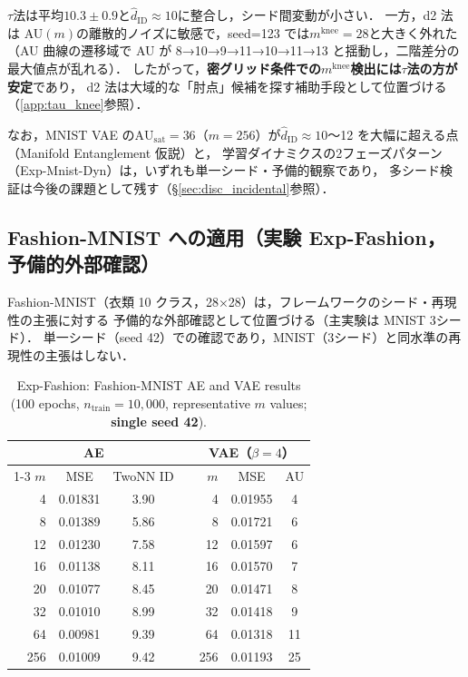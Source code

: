 \documentclass[11pt,a4paper]{jsarticle}
\newcommand{\AUsat}{\mathrm{AU}_{\mathrm{sat}}}
\newcommand{\mknee}{m^{\mathrm{knee}}}
\begin{document}
$\tau$法は平均$10.3 \pm 0.9$と$\hat{d}_\mathrm{ID} \approx 10$に整合し，シード間変動が小さい．
一方，d2 法は AU$(m)$の離散的ノイズに敏感で，seed=123 では$\mknee = 28$と大きく外れた
（AU 曲線の遷移域で AU が 8→10→9→11→10→11→13 と揺動し，二階差分の最大値点が乱れる）．
したがって，\textbf{密グリッド条件での$\mknee$検出には$\tau$法の方が安定}であり，
d2 法は大域的な「肘点」候補を探す補助手段として位置づける（\ref{app:tau_knee}参照）．

なお，MNIST VAE の$\AUsat = 36$（$m=256$）が$\hat{d}_\mathrm{ID} \approx 10$〜12 を大幅に超える点（Manifold Entanglement 仮説）と，
学習ダイナミクスの2フェーズパターン（Exp-Mnist-Dyn）は，いずれも単一シード・予備的観察であり，
多シード検証は今後の課題として残す（§\ref{sec:disc_incidental}参照）．

\subsection{Fashion-MNIST への適用（実験 Exp-Fashion，予備的外部確認）}\label{sec:exp_fashion}

Fashion-MNIST（衣類 10 クラス，28×28）は，フレームワークのシード・再現性の主張に対する
予備的な外部確認として位置づける（主実験は MNIST 3シード）．
単一シード（seed 42）での確認であり，MNIST（3シード）と同水準の再現性の主張はしない．

\begin{table}[H]
\centering
\caption{Exp-Fashion: Fashion-MNIST AE and VAE results (100 epochs, $n_\mathrm{train}=10{,}000$, representative $m$ values; \textbf{single seed 42}).}
\label{tab:ef}
\small
\begin{tabular}{rcccrcc}
\toprule
\multicolumn{3}{c}{AE} & \phantom{xx} & \multicolumn{3}{c}{VAE（$\beta=4$）} \\
\cmidrule{1-3}\cmidrule{5-7}
$m$ & MSE & TwoNN ID && $m$ & MSE & AU \\
\midrule
 4  & 0.01831 & 3.90 && 4  & 0.01955 & 4  \\
 8  & 0.01389 & 5.86 && 8  & 0.01721 & 6  \\
12  & 0.01230 & 7.58 && 12 & 0.01597 & 6  \\
16  & 0.01138 & 8.11 && 16 & 0.01570 & 7  \\
20  & 0.01077 & 8.45 && 20 & 0.01471 & 8  \\
32  & 0.01010 & 8.99 && 32 & 0.01418 & 9  \\
64  & 0.00981 & 9.39 && 64 & 0.01318 & 11 \\
256 & 0.01009 & 9.42 && 256& 0.01193 & 25 \\
\bottomrule
\end{tabular}
\end{table}
\end{document}
